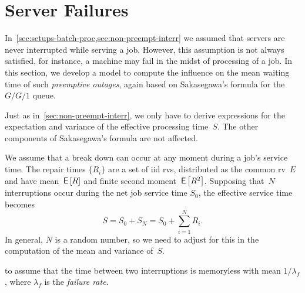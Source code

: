 \documentclass[queueing-book.tex]{subfiles}
\begin{document}
\section{Server Failures}
\label{sec:preempt-interr-serv}

In~\cref{sec:setups-batch-proc,sec:non-preempt-interr} we assumed that servers are never interrupted while serving a job.
However, this assumption is not always satisfied, for instance, a machine may fail in the midst of processing of a job.
In this section, we develop a model
to compute the influence on the mean waiting time of such \emph{preemptive outages}, again based on Sakasegawa's formula for the $G/G/1$ queue.


Just as in~\cref{sec:non-preempt-interr}, we only have to derive expressions for the expectation and variance of the effective processing time~$S$. The other components of Sakasegawa's formula are not affected.


We assume that a break down can occur at any moment during a job's service time.
The repair times $\{R_i\}$ are a set of iid rvs, distributed as the common rv~$E$ and have mean $\,\mathsf{E}\left[R\right]$ and finite second moment $\,\mathsf{E}\left[R^{2}\right]$.
Supposing that~$N$ interruptions occur during the net job service time $S_0$, the effective service time becomes
\begin{equation}\label{eq:f1}
  S= S_0 + S_N = S_0 + \sum_{i=1}^N R_i.
\end{equation}
In general,  $N$ is a random number, so we need to adjust for this in the computation of the mean and variance of~$S$.


 to assume that the time between two interruptions is memoryless with mean $1/\lambda_f$, where $\lambda_f$ is the \emph{failure rate}.
\end{document}
